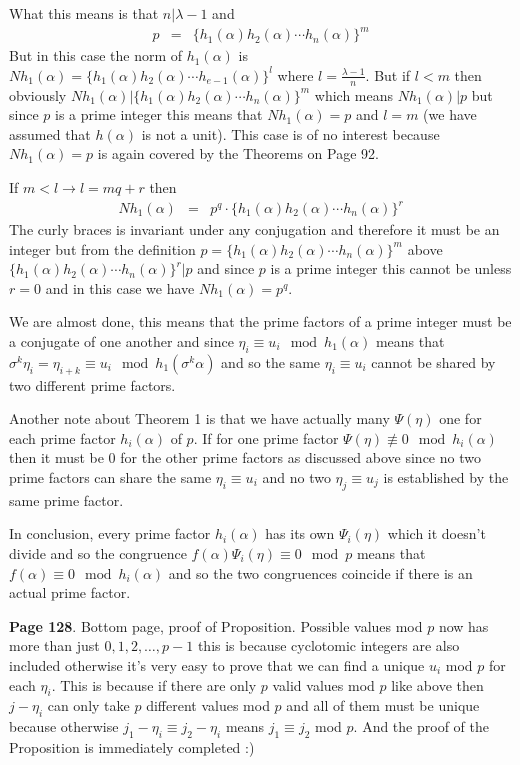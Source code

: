 \documentclass[aps,preprint,preprintnumbers,nofootinbib,showpacs,prd]{revtex4-1}
\newcommand{\nbea}{\begin{eqnarray*}}
\newcommand{\neea}{\end{eqnarray*}}
\begin{document}
What this means is that $n|\lambda - 1$ and
%
\nbea
p & = & \{h_1(\alpha)h_2(\alpha) \cdots h_{n}(\alpha)\}^m
\neea
%
But in this case the norm of $h_1(\alpha)$ is $Nh_1(\alpha) = \{h_1(\alpha)h_2(\alpha) \cdots h_{e-1}(\alpha)\}^l$ where $l = \frac{\lambda - 1}{n}$. But if $l < m$ then obviously $Nh_1(\alpha) | \{h_1(\alpha)h_2(\alpha) \cdots h_{n}(\alpha)\}^m$ which means $Nh_1(\alpha) | p$ but since $p$ is a prime integer this means that $Nh_1(\alpha) = p$ and $l = m$ (we have assumed that $h(\alpha)$ is not a unit). This case is of no interest because $Nh_1(\alpha) = p$ is again covered by the Theorems on Page 92.

If $m < l \to l = mq + r$ then 
%
\nbea
Nh_1(\alpha) & = & p^q \cdot  \{h_1(\alpha)h_2(\alpha) \cdots h_{n}(\alpha)\}^{r}
\neea
%
The curly braces is invariant under any conjugation and therefore it must be an integer but from the definition $p = \{h_1(\alpha)h_2(\alpha) \cdots h_{n}(\alpha)\}^m$ above $\{h_1(\alpha)h_2(\alpha) \cdots h_{n}(\alpha)\}^{r} | p$ and since $p$ is a prime integer this cannot be unless $r = 0$ and in this case we have $Nh_1(\alpha) = p^q$.

We are almost done, this means that the prime factors of a prime integer must be a conjugate of one another and since $\eta_i \equiv u_i \mod{h_1(\alpha)}$ means that $\sigma^k\eta_i = \eta_{i + k} \equiv u_i \mod{h_1(\sigma^k \alpha)}$ and so the same $\eta_i \equiv u_i$ cannot be shared by two different prime factors.

Another note about Theorem 1 is that we have actually many $\Psi(\eta)$ one for each prime factor $h_i(\alpha)$ of $p$. If for one prime factor $\Psi(\eta) \not\equiv 0 \mod{h_i(\alpha)}$ then it must be 0 for the other prime factors as discussed above since no two prime factors can share the same $\eta_i \equiv u_i$ and no two $\eta_j \equiv u_j$ is established by the same prime factor.

In conclusion, every prime factor $h_i(\alpha)$ has its own $\Psi_i(\eta)$ which it doesn't divide and so the congruence $f(\alpha)\Psi_i(\eta) \equiv 0 \mod{p}$ means that $f(\alpha) \equiv 0 \mod{h_i(\alpha)}$ and so the two congruences coincide if there is an actual prime factor.




{\bf Page 128}. Bottom page, proof of Proposition. Possible values mod $p$ now has more than just $0,1,2,\dots, p-1$ this is because cyclotomic integers are also included otherwise it's very easy to prove that we can find a unique $u_i$ mod $p$ for each $\eta_i$. This is because if there are only $p$ valid values mod $p$ like above then $j - \eta_i$ can only take $p$ different values mod $p$ and all of them must be unique because otherwise $j_1 -\eta_i \equiv j_2 -\eta_i$ means $j_1 \equiv j_2$ mod $p$. And the proof of the Proposition is immediately completed :)
\end{document}
